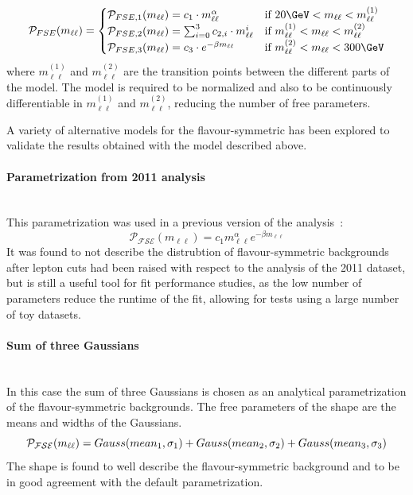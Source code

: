 \begin{eqnarray*}
{\mathcal{P}}_{FSE}(m_{\ell\ell}) = \begin{cases} {\mathcal{P}}_{FSE,1}(m_{\ell\ell}) = c_{1} \cdot m_{\ell\ell}^{\alpha} &\mbox{if } 20\GeV < m_{\ell\ell} < m_{\ell\ell}^{(1)} \\
{\mathcal{P}}_{FSE,2}(m_{\ell\ell}) = \sum_{i=0}^{3} c_{2,i} \cdot m_{\ell\ell}^{i} & \mbox{if } m_{\ell\ell}^{(1)}<m_{\ell\ell}<m_{\ell\ell}^{(2)} \\
{\mathcal{P}}_{FSE,3}(m_{\ell\ell}) = c_{3}\cdot e^{-\beta m_{\ell\ell}} & \mbox{if } m_{\ell\ell}^{(2)}<m_{\ell\ell}<300\GeV \\
\end{cases} 
\end{eqnarray*}
where $m_{\ell\ell}^{(1)}$ and $m_{\ell\ell}^{(2)}$ are the transition points between the different parts of the model. The model is required to be normalized and also to be continuously differentiable in $m_{\ell\ell}^{(1)}$ and $m_{\ell\ell}^{(2)}$, reducing the number of free parameters. 


A variety of alternative models for the flavour-symmetric has been explored to validate the results obtained with the model described above. 

\paragraph{Parametrization from 2011 analysis}\mbox{} \\
This parametrization was used in a previous version of the analysis~\cite{edge2011}: 
\begin{equation*}
 \mathcal{P_{FSE}}(m_{\ell\ell}) = c_{1} m_{\ell\ell}^{\alpha} e^{-\beta m_{\ell\ell}}
\end{equation*}
It was found to not describe the distrubtion of flavour-symmetric backgrounds after lepton \pt cuts had been raised with respect to the analysis of the 2011 dataset, but is still a useful tool for fit performance studies, as the low number of parameters reduce the runtime of the fit, allowing for tests using a large number of toy datasets.
\paragraph{Sum of three Gaussians}\mbox{} \\
In this case the sum of three Gaussians is chosen as an analytical parametrization of the flavour-symmetric backgrounds. The free parameters of the shape are the means and widths of the Gaussians.
\begin{equation*}
\mathcal{P_{FSE}}(m_{\ell\ell}) = Gauss(mean_1,\sigma_1) + Gauss(mean_2,\sigma_2) + Gauss(mean_3,\sigma_3)\\
\end{equation*}
The shape is found to well describe the flavour-symmetric background and to be in good agreement with the default parametrization.
